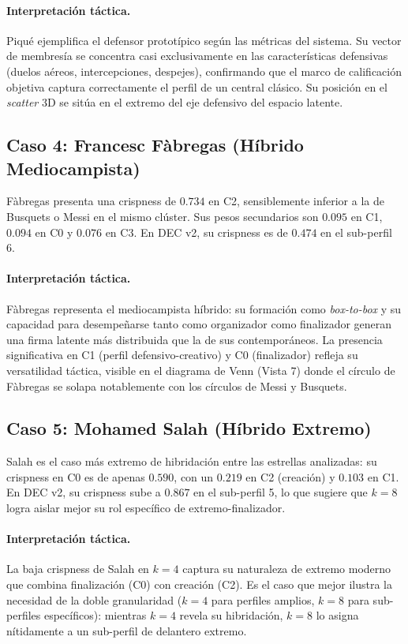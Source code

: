 \documentclass[conference]{IEEEtran}
\begin{document}
\paragraph{Interpretación táctica.} Piqué ejemplifica el defensor prototípico según las métricas del sistema. Su vector de membresía se concentra casi exclusivamente en las características defensivas (duelos aéreos, intercepciones, despejes), confirmando que el marco de calificación objetiva captura correctamente el perfil de un central clásico. Su posición en el \textit{scatter} 3D se sitúa en el extremo del eje defensivo del espacio latente.

\subsection{Caso 4: Francesc Fàbregas (Híbrido Mediocampista)}

Fàbregas presenta una crispness de $0.734$ en C2, sensiblemente inferior a la de Busquets o Messi en el mismo clúster. Sus pesos secundarios son $0.095$ en C1, $0.094$ en C0 y $0.076$ en C3. En DEC v2, su crispness es de $0.474$ en el sub-perfil 6.

\paragraph{Interpretación táctica.} Fàbregas representa el mediocampista híbrido: su formación como \textit{box-to-box} y su capacidad para desempeñarse tanto como organizador como finalizador generan una firma latente más distribuida que la de sus contemporáneos. La presencia significativa en C1 (perfil defensivo-creativo) y C0 (finalizador) refleja su versatilidad táctica, visible en el diagrama de Venn (Vista 7) donde el círculo de Fàbregas se solapa notablemente con los círculos de Messi y Busquets.

\subsection{Caso 5: Mohamed Salah (Híbrido Extremo)}

Salah es el caso más extremo de hibridación entre las estrellas analizadas: su crispness en C0 es de apenas $0.590$, con un $0.219$ en C2 (creación) y $0.103$ en C1. En DEC v2, su crispness sube a $0.867$ en el sub-perfil 5, lo que sugiere que $k=8$ logra aislar mejor su rol específico de extremo-finalizador.

\paragraph{Interpretación táctica.} La baja crispness de Salah en $k=4$ captura su naturaleza de extremo moderno que combina finalización (C0) con creación (C2). Es el caso que mejor ilustra la necesidad de la doble granularidad ($k=4$ para perfiles amplios, $k=8$ para sub-perfiles específicos): mientras $k=4$ revela su hibridación, $k=8$ lo asigna nítidamente a un sub-perfil de delantero extremo.
\end{document}
